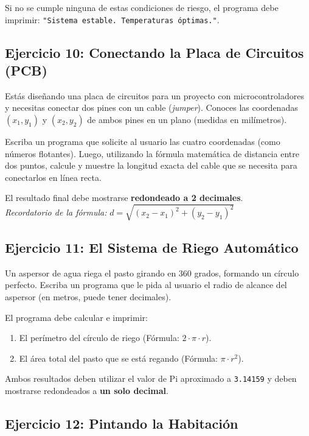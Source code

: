 \documentclass[11pt, a4paper]{article}
\begin{document}
	Si no se cumple ninguna de estas condiciones de riesgo, el programa debe imprimir:  \texttt{"Sistema estable. Temperaturas óptimas."}.
	
	
	\subsection*{Ejercicio 10: Conectando la Placa de Circuitos (PCB)}
	
	Estás diseñando una placa de circuitos para un proyecto con microcontroladores y necesitas conectar dos pines con un cable (\textit{jumper}). Conoces las coordenadas $(x_1, y_1)$ y $(x_2, y_2)$ de ambos pines en un plano (medidas en milímetros). 
	
	Escriba un programa que solicite al usuario las cuatro coordenadas (como números flotantes). Luego, utilizando la fórmula matemática de distancia entre dos puntos, calcule y muestre la longitud exacta del cable que se necesita para conectarlos en línea recta.
	
	El resultado final debe mostrarse \textbf{redondeado a 2 decimales}.\\
	
	\textit{Recordatorio de la fórmula:} $d = \sqrt{(x_2 - x_1)^2 + (y_2 - y_1)^2}$
	
	
	\subsection*{Ejercicio 11: El Sistema de Riego Automático}
	
	Un aspersor de agua riega el pasto girando en 360 grados, formando un círculo perfecto. Escriba un programa que le pida al usuario el radio de alcance del aspersor (en metros, puede tener decimales). 
	
	El programa debe calcular e imprimir:
	\begin{enumerate}
		\item El perímetro del círculo de riego (Fórmula: $2 \cdot \pi \cdot r$).
		\item El área total del pasto que se está regando (Fórmula: $\pi \cdot r^2$).
	\end{enumerate}
	
	Ambos resultados deben utilizar el valor de Pi aproximado a \texttt{3.14159} y deben mostrarse redondeados a \textbf{un solo decimal}.
	
	
	\subsection*{Ejercicio 12: Pintando la Habitación}
	
\end{document}
